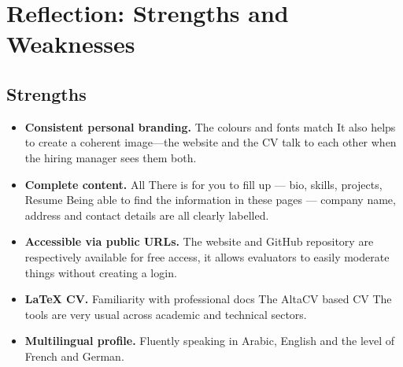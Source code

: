 \documentclass[12pt,a4paper]{article}
\begin{document}
\section{Reflection: Strengths and Weaknesses}

\subsection{Strengths}
\begin{itemize}
    \item \textbf{Consistent personal branding.} The colours and fonts match  It also helps to create a coherent image—the website and the CV talk to each other when the hiring manager sees them both.
    \item \textbf{Complete content.} All There is for you to fill up — bio, skills, projects, Resume Being able to find the information in these pages — company name, address and contact details are all clearly labelled.
    \item \textbf{Accessible via public URLs.} The website and GitHub repository are respectively available for free access, it allows evaluators to easily moderate things without creating a login.
    \item \textbf{LaTeX CV.} Familiarity with professional docs The AltaCV based CV The tools are very usual across academic and technical sectors.
    \item \textbf{Multilingual profile.} Fluently speaking in Arabic, English and the level of  French and German.
\end{itemize}
\end{document}
